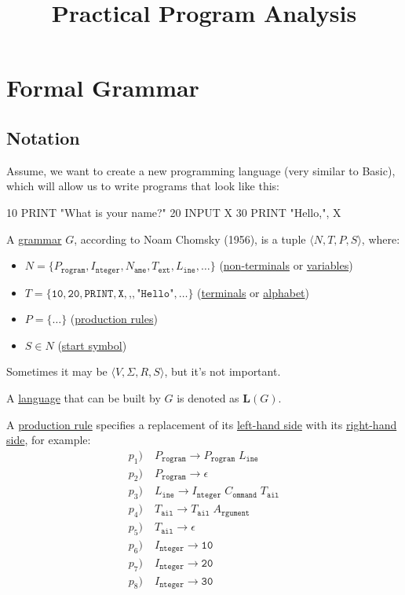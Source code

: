 \documentclass[sigsoft,12pt,nonacm]{acmart}
\title{Practical Program Analysis}
\renewcommand\emph[1]{\ul{#1}}
\begin{document}
\section{Formal Grammar}

\subsection{Notation}

Assume, we want to create a new programming language (very similar to Basic),
which will allow us to write programs that look like this:

\begin{ffcode}
10 PRINT "What is your name?"
20 INPUT X
30 PRINT "Hello,", X
\end{ffcode}

A \emph{grammar} $G$, according to Noam Chomsky (1956), is a tuple $\langle N, T, P, S\rangle$, where:
\begin{itemize}
  \item $N = \{ P_\texttt{rogram}, I_\texttt{nteger},
    N_\texttt{ame}, T_\texttt{ext}, L_\texttt{ine}, \dots \}$ (\emph{non-terminals} or \emph{variables})
  \item $T = \{ \texttt{10}, \texttt{20},
    \texttt{PRINT}, \texttt{X}, \texttt{,}, \texttt{"Hello"}, \dots \}$ (\emph{terminals} or \emph{alphabet})
  \item $P = \{ \dots \}$ (\emph{production rules})
  \item $S \in N$ (\emph{start symbol})
\end{itemize}

Sometimes it may be $\langle V, \Sigma, R, S\rangle$, but it's not important.

A \emph{language} that can be built by $G$ is denoted as $\bm{L}(G)$.

A \emph{production rule} specifies a replacement of its \emph{left-hand side} with its \emph{right-hand side}, for example:
\begin{equation*}
\begin{split}
p_1)\; & P_\texttt{rogram} \to P_\texttt{rogram} \; L_\texttt{ine} \\
p_2)\; & P_\texttt{rogram} \to \epsilon \\
p_3)\; & L_\texttt{ine} \to I_\texttt{nteger} \; C_\texttt{ommand} \; T_\texttt{ail} \\
p_4)\; & T_\texttt{ail} \to T_\texttt{ail} \; A_\texttt{rgument} \\
p_5)\; & T_\texttt{ail} \to \epsilon \\
p_6)\; & I_\texttt{nteger} \to \texttt{10} \\
p_7)\; & I_\texttt{nteger} \to \texttt{20} \\
p_8)\; & I_\texttt{nteger} \to \texttt{30} \\
\end{split}
\end{equation*}
\end{document}
